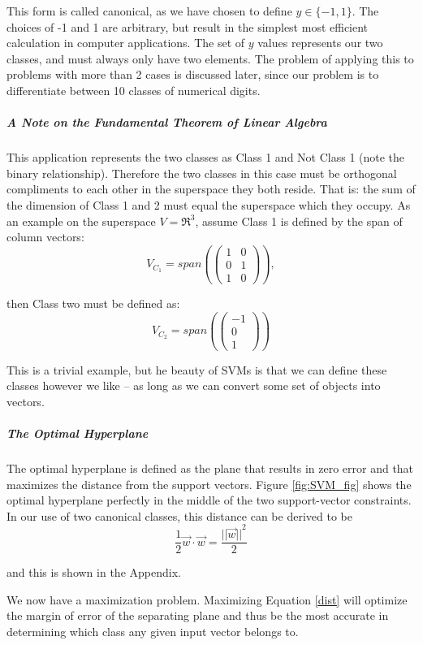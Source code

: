 This form is called canonical, as we have chosen to define $y \in \{-1, 1\}$. The choices of -1 and 1 are arbitrary, but result in the simplest most efficient calculation in computer applications. The set of $y$ values represents our two classes, and must always only have two elements. The problem of applying this to problems with more than 2 cases is discussed later, since our problem is to differentiate between 10 classes of numerical digits.
\subparagraph{A Note on the Fundamental Theorem of Linear Algebra}
This application represents the two classes as Class 1 and Not Class 1 (note the binary relationship). Therefore the two classes in this case must be orthogonal compliments to each other in the superspace they both reside. That is: the sum of the dimension of Class 1 and 2 must equal the superspace which they occupy. As an example on the superspace $V = \Re^3$, assume Class 1 is defined by the span of column vectors: 
\begin{equation}
V_{C_{1}} = 
span(\begin{pmatrix}
1 & 0 \\0 & 1\\1& 0
\end{pmatrix}),
\end{equation}

then Class two must be defined as:
\begin{equation}
V_{C_{2}} = span(\begin{pmatrix}
-1\\0\\1
\end{pmatrix}
)
\end{equation}

This is a trivial example, but he beauty of SVMs is that we can define these classes however we like -- as long as we can convert some set of objects into vectors.
\subparagraph{The Optimal Hyperplane}

The optimal hyperplane is defined as the plane that results in zero error and that maximizes the distance from the support vectors. Figure \ref{fig:SVM_fig} shows the optimal hyperplane perfectly in the middle of the two support-vector constraints. In our use of two canonical classes, this distance can be derived to be 
\begin{equation}
\frac{1}{2}\vec{w}\cdot\vec{w} = \frac{{||\vec{w}||}^2}{2}
\label{dist}
\end{equation}

 and this is shown in the Appendix.

We now have a maximization problem. Maximizing Equation \ref{dist} will optimize the margin of error of the separating plane and thus be the most accurate in determining which class any given input vector belongs to. 

